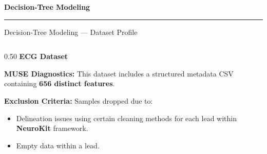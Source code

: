 \documentclass[10pt,aspectratio=169]{beamer}
\newcommand{\Raleway}{\sffamily}
\begin{document}
{%
  \begin{frame}
    \vfill
    \centering
    {\Raleway\bfseries\Huge\color{white} Decision-Tree Modeling}\\[0.6em]
    {\color{aggiegold}\rule{6cm}{0.06cm}}
    \vfill
  \end{frame}
}

\begin{frame}{Decision-Tree Modeling --- Dataset Profile}
  \begin{columns}[T]
    
    \begin{column}{0.50\textwidth}
      \centering
      {\small\Raleway\bfseries\color{aggieblue} ECG Dataset}\\[0.4em]
      
      \vspace{0.8em}
      \begin{flushleft}
        \color{coolgray}
        \textbf{MUSE Diagnostics:} This dataset includes a structured metadata CSV containing \textbf{656 distinct features}.
        
        \vspace{0.4em}
        \textbf{Exclusion Criteria:} Samples dropped due to:
        \begin{itemize}
          \item Delineation issues using certain cleaning methods for each lead within \textbf{NeuroKit} framework.
          \item Empty data within a lead.
        \end{itemize}
      \end{flushleft}
    \end{column}
    

\end{columns}
\end{frame}
\end{document}
